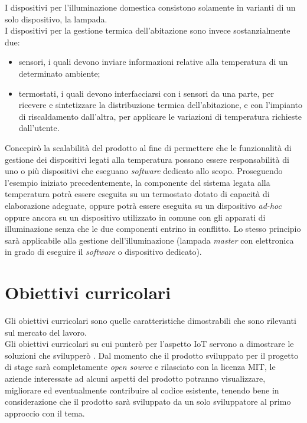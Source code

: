 I dispositivi per l'illuminazione domestica consistono solamente in varianti di un solo dispositivo, la lampada. \\
I dispositivi per la gestione termica dell'abitazione sono invece sostanzialmente due:
\begin{itemize}
  \item sensori, i quali devono inviare informazioni relative alla temperatura di un determinato ambiente;
  \item termostati, i quali devono interfacciarsi con i sensori da una parte, per ricevere e sintetizzare la distribuzione termica dell'abitazione, e con l'impianto di riscaldamento dall'altra, per applicare le variazioni di temperatura richieste dall'utente.
\end{itemize}

Concepirò la scalabilità del prodotto al fine di permettere che le funzionalità di gestione dei dispositivi legati alla temperatura possano essere responsabilità di uno o più dispositivi che eseguano \emph{software} dedicato allo scopo.
Proseguendo l'esempio iniziato precedentemente, la componente del sistema legata alla temperatura potrà essere eseguita su un termostato dotato di capacità di elaborazione adeguate, oppure potrà essere eseguita su un dispositivo \emph{ad-hoc} oppure ancora su un dispositivo utilizzato in comune con gli apparati di illuminazione senza che le due componenti entrino in conflitto.
Lo stesso principio sarà applicabile alla gestione dell'illuminazione (lampada \emph{master} con elettronica in grado di eseguire il \emph{software} o dispositivo dedicato).



\section{Obiettivi curricolari}

Gli obiettivi curricolari sono quelle caratteristiche dimostrabili che sono rilevanti sul mercato del lavoro. \\

Gli obiettivi curricolari su cui punterò per l'aspetto IoT servono a dimostrare le soluzioni che svilupperò .
Dal momento che il prodotto sviluppato per il progetto di stage sarà completamente \emph{open source} e rilasciato con la licenza \gls{MIT}, le aziende interessate ad alcuni aspetti del prodotto potranno visualizzare, migliorare ed eventualmente contribuire al codice esistente, tenendo bene in considerazione che il prodotto sarà sviluppato da un solo sviluppatore al primo approccio con il tema. \\

